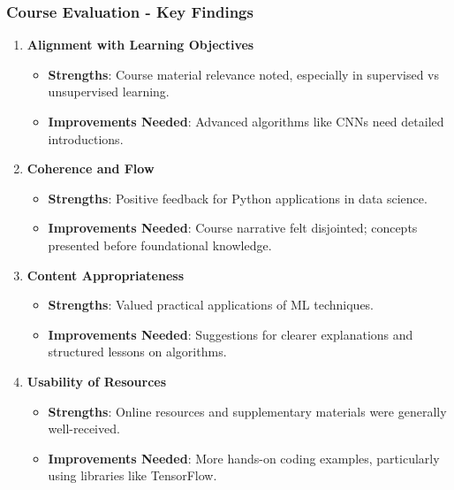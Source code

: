\documentclass[aspectratio=169]{beamer}
\begin{document}
\begin{frame}[fragile]
    \frametitle{Course Evaluation - Key Findings}
    \begin{enumerate}
        \item \textbf{Alignment with Learning Objectives}
            \begin{itemize}
                \item \textbf{Strengths}: Course material relevance noted, especially in supervised vs unsupervised learning.
                \item \textbf{Improvements Needed}: Advanced algorithms like CNNs need detailed introductions.
            \end{itemize}

        \item \textbf{Coherence and Flow}
            \begin{itemize}
                \item \textbf{Strengths}: Positive feedback for Python applications in data science.
                \item \textbf{Improvements Needed}: Course narrative felt disjointed; concepts presented before foundational knowledge.
            \end{itemize}
        
        \item \textbf{Content Appropriateness}
            \begin{itemize}
                \item \textbf{Strengths}: Valued practical applications of ML techniques.
                \item \textbf{Improvements Needed}: Suggestions for clearer explanations and structured lessons on algorithms.
            \end{itemize}
        
        \item \textbf{Usability of Resources}
            \begin{itemize}
                \item \textbf{Strengths}: Online resources and supplementary materials were generally well-received.
                \item \textbf{Improvements Needed}: More hands-on coding examples, particularly using libraries like TensorFlow.
            \end{itemize}
    \end{enumerate}
\end{frame}
\end{document}
